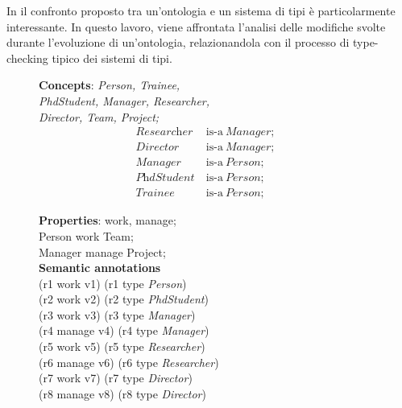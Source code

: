 In \cite{despeyroux2008evolution} il confronto proposto tra un'ontologia e un sistema di tipi è particolarmente interessante. In questo lavoro, viene affrontata l'analisi delle modifiche svolte durante l'evoluzione di un'ontologia, relazionandola con il processo di type-checking tipico dei sistemi di tipi.

\begin{figure}[t!]
	\begin{minipage}[t]{0.45\textwidth}
			\textbf{Concepts}: \textit{Person, Trainee,\\
			PhdStudent, Manager, Researcher,\\
			Director, Team,
			Project;}
			\begin{align}
			\textit{Researcher}\ &\text{is-a}\ \textit{Manager};&\\
			\textit{Director}\ &\text{is-a}\ \textit{Manager};&\\
			\textit{Manager}\ &\text{is-a}\ \textit{Person};&\\
			\textit{PhdStudent}\ &\text{is-a}\ \textit{Person};&\\
			\textit{Trainee}\ &\text{is-a}\ \textit{Person};&
			\end{align}
			
			\textbf{Properties}: work, manage;\\
			Person work Team;\\
			Manager manage Project;\\

		\textbf{Semantic annotations}\\
			(r1 work v1) (r1 type \textit{Person})\\
			(r2 work v2) (r2 type \textit{PhdStudent})\\
			(r3 work v3) (r3 type \textit{Manager})\\
			(r4 manage v4) (r4 type \textit{Manager})\\
			(r5 work v5) (r5 type \textit{Researcher})\\
			(r6 manage v6) (r6 type \textit{Researcher})\\
			(r7 work v7) (r7 type \textit{Director})\\
			(r8 manage v8) (r8 type \textit{Director})\\

	\end{minipage}
	\hspace{0.05\textwidth}
	\begin{minipage}[t]{0.45\textwidth}
		

\end{minipage}
\end{figure}
